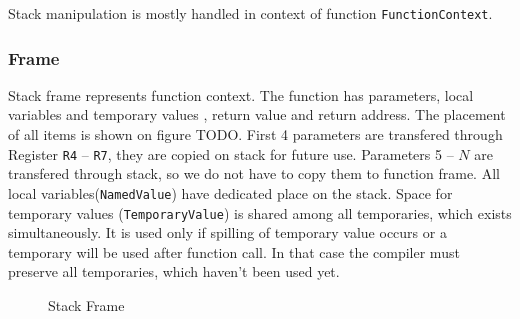 \documentclass[12pt]{article}
\begin{document}
Stack manipulation is mostly handled in context of function \texttt{FunctionContext}.

\subsubsection{Frame}
Stack frame represents function context. The function has parameters, local variables and temporary values , return value and return address. The placement of all items is shown on figure TODO. First 4 parameters are transfered through Register \texttt{R4} -- \texttt{R7}, they are copied on stack for future use. Parameters 5 -- $N$ are transfered through stack, so we do not have to copy them to function frame. All local variables(\texttt{NamedValue}) have dedicated place on the stack. Space for temporary values (\texttt{TemporaryValue}) is shared among all temporaries, which exists simultaneously. It is used only if spilling of temporary value occurs or a temporary will be used after function call. In that case the compiler must preserve all temporaries, which haven't been used yet.

\begin{figure}[!h]
	\centering
	\caption{Stack Frame}
\end{figure}
\end{document}
